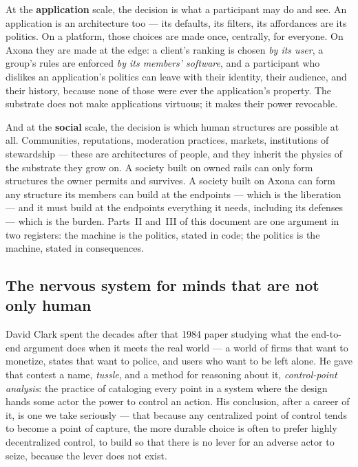 \documentclass[nobib,justified]{tufte-handout}
\begin{document}
At the \textbf{application} scale, the decision is what a participant may do
and see. An application is an architecture too --- its defaults, its filters,
its affordances are its politics. On a platform, those choices are made once,
centrally, for everyone. On Axona they are made at the edge: a client's
ranking is chosen \emph{by its user}, a group's rules are enforced \emph{by
its members' software}, and a participant who dislikes an application's
politics can leave with their identity, their audience, and their history,
because none of those were ever the application's property. The substrate
does not make applications virtuous; it makes their power revocable.

And at the \textbf{social} scale, the decision is which human structures are
possible at all. Communities, reputations, moderation practices, markets,
institutions of stewardship --- these are architectures of people, and they
inherit the physics of the substrate they grow on. A society built on owned
rails can only form structures the owner permits and survives. A society
built on Axona can form any structure its members can build at the endpoints
--- which is the liberation --- and it must build at the endpoints everything
it needs, including its defenses --- which is the burden. Parts~II and~III of
this document are one argument in two registers: the machine is the politics,
stated in code; the politics is the machine, stated in consequences.

\subsection{The nervous system for minds that are not only human}

David Clark spent the decades after that 1984 paper studying what the
end-to-end argument does when it meets the real world --- a world of firms
that want to monetize, states that want to police, and users who want to be
left alone. He gave that contest a name, \emph{tussle}, and a method for
reasoning about it, \emph{control-point analysis}: the practice of cataloging
every point in a system where the design hands some actor the power to control
an action. His conclusion, after a career of it, is one we
take seriously --- that because any centralized point of control tends to
become a point of capture, the more durable choice is often to prefer highly
decentralized control, to build so that there is no lever for an adverse actor
to seize, because the lever does not exist.
\end{document}
